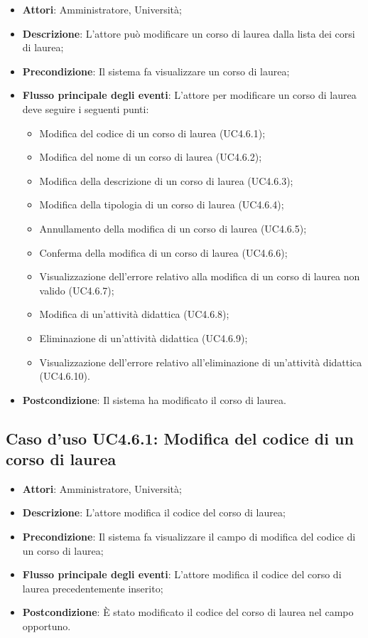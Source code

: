 \begin{itemize}
	\item \textbf{Attori}: Amministratore, Università;
	\item \textbf{Descrizione}: L'attore può modificare un corso di laurea dalla lista dei corsi di laurea;
	
	\item \textbf{Precondizione}: Il sistema fa visualizzare un corso di laurea;
	
	\item \textbf{Flusso principale degli eventi}: L'attore per modificare un corso di laurea deve seguire i seguenti punti:
	
	\begin{itemize}
		\item Modifica del codice di un corso di laurea (UC4.6.1);
		\item Modifica del nome di un corso di laurea (UC4.6.2);
		\item Modifica della descrizione di un corso di laurea (UC4.6.3);
		\item Modifica della tipologia di un corso di laurea (UC4.6.4);
		\item Annullamento della modifica di un corso di laurea (UC4.6.5);
		\item Conferma della modifica di un corso di laurea (UC4.6.6);
		\item Visualizzazione dell'errore relativo alla modifica di un corso di laurea non valido (UC4.6.7);
		\item Modifica di un'attività didattica (UC4.6.8);
		\item Eliminazione di un'attività didattica (UC4.6.9);
		\item Visualizzazione dell'errore relativo all'eliminazione di un'attività didattica (UC4.6.10).
	\end{itemize}
	\item \textbf{Postcondizione}: Il sistema ha modificato il corso di laurea.
	
\end{itemize}
\subsection{Caso d'uso \texorpdfstring{UC4.6.1}{UC4.6.1}: Modifica del codice di un corso di laurea}
\begin{itemize}
	\item \textbf{Attori}: Amministratore, Università;
	\item \textbf{Descrizione}: L'attore modifica il codice del corso di laurea;
	
	\item \textbf{Precondizione}: Il sistema fa visualizzare il campo di modifica del codice di un corso di laurea;
	\item \textbf{Flusso principale degli eventi}: L'attore modifica il codice del corso di laurea precedentemente inserito;
	
	\item \textbf{Postcondizione}: È stato modificato il codice del corso di laurea nel campo opportuno.
	
	
\end{itemize}
